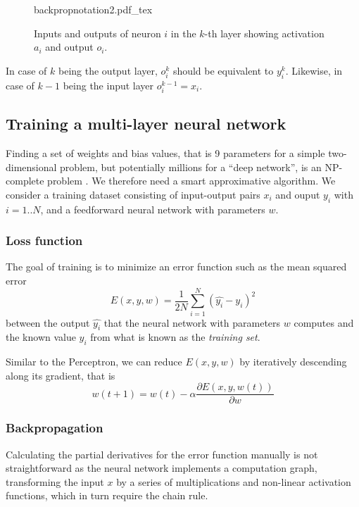 \begin{figure}[htb]
    \centering
    \def\svgwidth{0.7\textwidth}
    {backpropnotation2.pdf_tex}
    \caption{Inputs and outputs of neuron $i$ in the $k$-th layer showing activation $a_i$ and output $o_i$.\label{fig:backpropnotation2}}
\end{figure}

In case of $k$ being the output layer, $o_i^k$ should be equivalent to $y_i^k$. Likewise, in case of $k-1$ being the input layer $o_i^{k-1}=x_i$.

\subsection{Training a multi-layer neural network}

Finding a set of weights and bias values, that is 9 parameters for a simple two-dimensional problem, but potentially millions for a ``deep network'', is an NP-complete problem \cite{blum1992training}. We therefore need a smart approximative algorithm. We consider a training dataset consisting of input-output pairs $x_i$ and ouput $y_i$ with $i=1..N$, and a feedforward neural network with parameters $w$.

\subsubsection{Loss function}
The goal of training is to minimize an error function such as the mean squared error
\begin{equation}
E(x,y,w)=\frac{1}{2N}\sum_{i=1}^{N}(\hat{y_i}-y_i)^2
\end{equation}
between the output $\hat{y_i}$ that the neural network with parameters $w$ computes and the known value $y_i$ from what is known as the \textsl{training set}.

Similar to the Perceptron, we can reduce $E(x,y,w)$ by iteratively descending along its gradient, that is
\begin{equation}
w(t+1)=w(t)-\alpha \frac{\partial E(x,y,w(t))}{\partial w}
\end{equation}

\subsubsection{Backpropagation}\label{sec:backpropagation}
Calculating the partial derivatives for the error function manually is not straightforward as the neural network implements a computation graph, transforming the input $x$ by a series of multiplications and non-linear activation functions, which in turn require the chain rule.

